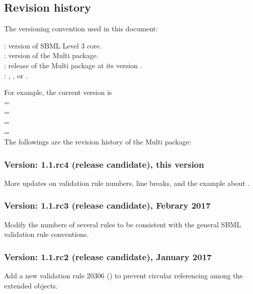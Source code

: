 \subsection{Revision history}
\label{def:revision_history}

The versioning convention used in this document: \\

: version of SBML Level 3 core. \\
: version of the Multi package. \\
: release of the Multi package at its version . \\ 
: , , or . 

For example, the current version is  \\
 =  \\
 =  \\
 =  \\
 =  \\

The followings are the revision history of the Multi package:

\subsubsection{Version: 1.1.rc4 (release candidate), this version}
\label{def:v1_1_rc4}

More updates on validation rule numbers, line breaks, and the example about \SubListOfSpeciesFeatures. 

\subsubsection{Version: 1.1.rc3 (release candidate), Febrary 2017}
\label{def:v1_1_rc3}

Modify the numbers of several rules to be consistent with the general SBML validation rule conventions. 

\subsubsection{Version: 1.1.rc2 (release candidate), January 2017}
\label{def:v1_1_rc2}

Add a new validation rule 20306 () to prevent circular referencing among the extended \ExCompartment objects.

